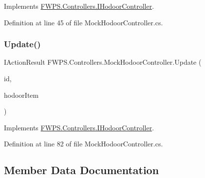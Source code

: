 Implements \mbox{\hyperlink{interface_f_w_p_s_1_1_controllers_1_1_i_hodoor_controller_a106763414af6e583aa8e73c23daeab2e}{F\+W\+P\+S.\+Controllers.\+I\+Hodoor\+Controller}}.



Definition at line 45 of file Mock\+Hodoor\+Controller.\+cs.

\mbox{\label{class_f_w_p_s_1_1_controllers_1_1_mock_hodoor_controller_a094bcc198643c2097f99ef9c21dd40da}} 
\subsubsection{\texorpdfstring{Update()}{Update()}}
{\footnotesize\ttfamily I\+Action\+Result F\+W\+P\+S.\+Controllers.\+Mock\+Hodoor\+Controller.\+Update (\begin{DoxyParamCaption}\item[{long}]{id,  }\item[{\mbox{\hyperlink{class_f_w_p_s_1_1_models_1_1_hodoor_item}{Hodoor\+Item}}}]{hodoor\+Item }\end{DoxyParamCaption})}



Implements \mbox{\hyperlink{interface_f_w_p_s_1_1_controllers_1_1_i_hodoor_controller_a9550c77b49185af0d0e6ba79514535f5}{F\+W\+P\+S.\+Controllers.\+I\+Hodoor\+Controller}}.



Definition at line 82 of file Mock\+Hodoor\+Controller.\+cs.



\subsection{Member Data Documentation}
\mbox{\label{class_f_w_p_s_1_1_controllers_1_1_mock_hodoor_controller_a90429641bb7747596322d77dff0f53c5}} 

